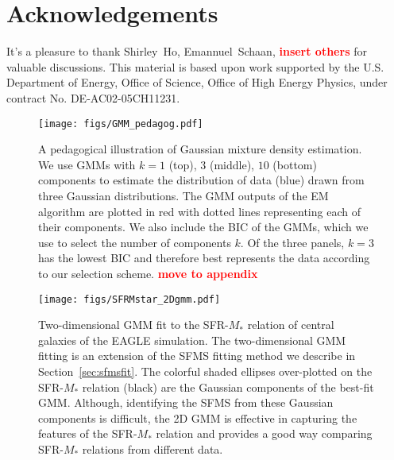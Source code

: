 \documentclass[preprint2,tighten]{aastex62}
\newcommand{\todo}[1]{{\bf \textcolor{red}{ #1}}}
\begin{document}
\section*{Acknowledgements}
It's a pleasure to thank
	Shirley~Ho, 
	Emannuel~Schaan, 
    \todo{insert others} 
for valuable discussions. 
This material is based upon work supported by the U.S. Department
of Energy, Office of Science, Office of High Energy Physics, under
contract No. DE-AC02-05CH11231.
\appendix
\begin{figure}
\begin{center}
\texttt{[image: figs/GMM\_pedagog.pdf]} 
\caption{A pedagogical illustration of Gaussian mixture density estimation. 
We use GMMs with $k = 1$ (top), $3$ (middle), $10$ (bottom) components to estimate 
the distribution of data (blue) drawn from three Gaussian distributions. The GMM 
outputs of the EM algorithm are plotted in red with dotted lines representing each 
of their components. We also include the BIC of the GMMs, which we use to select 
the number of components $k$. Of the three panels, $k=3$ has the lowest BIC and 
therefore best represents the data according to our selection 
scheme. \todo{move to appendix}} \label{fig:gmm_pedagog}
\end{center}
\end{figure}

\begin{figure*}
\begin{center}
\texttt{[image: figs/SFRMstar\_2Dgmm.pdf]} 
\caption{Two-dimensional GMM fit to the SFR-$M_*$ relation of central galaxies
of the EAGLE simulation. The two-dimensional GMM fitting is an extension of the 
SFMS fitting method we describe in Section~\ref{sec:sfmsfit}. The colorful shaded
ellipses over-plotted on the SFR-$M_*$ relation (black) are the Gaussian components 
of the best-fit GMM. Although, identifying the SFMS from these Gaussian components
is difficult, the 2D GMM is effective in capturing the features of the SFR-$M_*$ 
relation and provides a good way comparing SFR-$M_*$ relations from different data.
} \label{fig:2dgmm}
\end{center}
\end{figure*}
\end{document}
